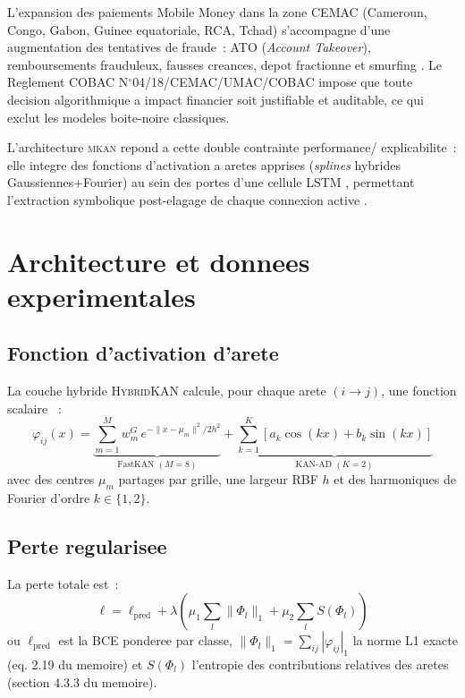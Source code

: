 \documentclass[11pt,a4paper,twocolumn]{article}
\newcommand{\MKAN}{\textsc{mkan}}
\newcommand{\phiij}{\varphi_{ij}}
\begin{document}
L'expansion des paiements Mobile Money dans la zone CEMAC (Cameroun,
Congo, Gabon, Guinee equatoriale, RCA, Tchad) s'accompagne d'une
augmentation des tentatives de fraude~: ATO (\textit{Account Takeover}),
remboursements frauduleux, fausses creances, depot fractionne et
smurfing \cite{gsma2023}. Le Reglement COBAC N$^{\circ}$04/18/CEMAC/UMAC/COBAC
\cite{cobac2018} impose que toute decision algorithmique a impact
financier soit justifiable et auditable, ce qui exclut les modeles
boite-noire classiques.

L'architecture \MKAN{} repond a cette double contrainte performance/
explicabilite~: elle integre des fonctions d'activation a aretes apprises
(\textit{splines} hybrides Gaussiennes+Fourier) au sein des portes d'une
cellule LSTM \cite{hochreiter1997}, permettant l'extraction symbolique
post-elagage de chaque connexion active \cite{liu2024kan}.

\section{Architecture et donnees experimentales}

\subsection{Fonction d'activation d'arete}

La couche hybride \textsc{HybridKAN} calcule, pour chaque arete
$(i \to j)$, une fonction scalaire \cite{liu2024kan,li2024fastkan}~:
\begin{equation}\label{eq:phi}
  \phiij(x) =
  \underbrace{\sum_{m=1}^{M} w_m^G\,
    e^{-\|x-\mu_m\|^2 / 2h^2}}_{\text{FastKAN }(M=8)}
  +
  \underbrace{\sum_{k=1}^{K}[a_k\cos(kx)+b_k\sin(kx)]}_{\text{KAN-AD }(K=2)}
\end{equation}
avec des centres $\mu_m$ partages par grille, une largeur RBF $h$
et des harmoniques de Fourier d'ordre $k\in\{1,2\}$.

\subsection{Perte regularisee}

La perte totale est~:
\begin{equation}\label{eq:loss}
  \ell = \ell_{\text{pred}}
  + \lambda\!\left(\mu_1 \!\sum_l \|\Phi_l\|_1
                 + \mu_2 \!\sum_l S(\Phi_l)\right)
\end{equation}
ou $\ell_{\text{pred}}$ est la BCE ponderee par classe,
$\|\Phi_l\|_1 = \sum_{ij}|\phiij|_1$ la norme L1 exacte
(eq. 2.19 du memoire) et $S(\Phi_l)$ l'entropie des contributions
relatives des aretes (section 4.3.3 du memoire).
\end{document}
